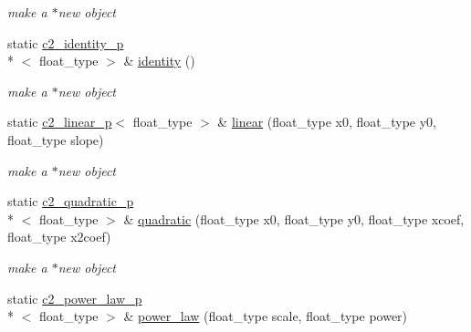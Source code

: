\begin{DoxyCompactItemize}
\begin{DoxyCompactList}\small\item\em make a $\ast$new object \end{DoxyCompactList}\item 
\hypertarget{classc2__factory_a66970667d203c0e63a016b08d2472dc4}{static \hyperlink{classc2__identity__p}{c2\-\_\-identity\-\_\-p}\\*
$<$ float\-\_\-type $>$ \& \hyperlink{classc2__factory_a66970667d203c0e63a016b08d2472dc4}{identity} ()}\label{classc2__factory_a66970667d203c0e63a016b08d2472dc4}

\begin{DoxyCompactList}\small\item\em make a $\ast$new object \end{DoxyCompactList}\item 
\hypertarget{classc2__factory_a2113dc577f24931e0cf316137faf557c}{static \hyperlink{classc2__linear__p}{c2\-\_\-linear\-\_\-p}$<$ float\-\_\-type $>$ \& \hyperlink{classc2__factory_a2113dc577f24931e0cf316137faf557c}{linear} (float\-\_\-type x0, float\-\_\-type y0, float\-\_\-type slope)}\label{classc2__factory_a2113dc577f24931e0cf316137faf557c}

\begin{DoxyCompactList}\small\item\em make a $\ast$new object \end{DoxyCompactList}\item 
\hypertarget{classc2__factory_a4fb1852ab65ee1c0d62196a260f0df8f}{static \hyperlink{classc2__quadratic__p}{c2\-\_\-quadratic\-\_\-p}\\*
$<$ float\-\_\-type $>$ \& \hyperlink{classc2__factory_a4fb1852ab65ee1c0d62196a260f0df8f}{quadratic} (float\-\_\-type x0, float\-\_\-type y0, float\-\_\-type xcoef, float\-\_\-type x2coef)}\label{classc2__factory_a4fb1852ab65ee1c0d62196a260f0df8f}

\begin{DoxyCompactList}\small\item\em make a $\ast$new object \end{DoxyCompactList}\item 
\hypertarget{classc2__factory_a2eb1ea80cc3c77555b519108cc0fad6b}{static \hyperlink{classc2__power__law__p}{c2\-\_\-power\-\_\-law\-\_\-p}\\*
$<$ float\-\_\-type $>$ \& \hyperlink{classc2__factory_a2eb1ea80cc3c77555b519108cc0fad6b}{power\-\_\-law} (float\-\_\-type scale, float\-\_\-type power)}\label{classc2__factory_a2eb1ea80cc3c77555b519108cc0fad6b}


\end{DoxyCompactItemize}
